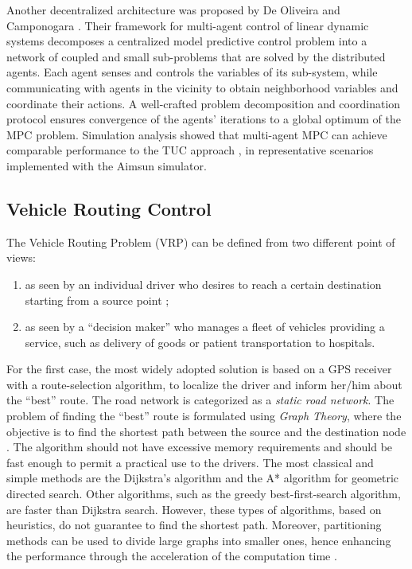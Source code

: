 \documentclass[10pt,onecolumn]{article}
\begin{document}
Another decentralized architecture was proposed by De Oliveira and Camponogara \cite{deOliveira2010}. Their framework for multi-agent control of linear dynamic systems decomposes a centralized model predictive control problem into a network of coupled and small sub-problems that are solved by the distributed agents. 
Each agent senses and controls the variables of its sub-system, while communicating with agents in the vicinity to obtain neighborhood variables and coordinate their actions. A well-crafted problem decomposition and coordination protocol ensures convergence of the agents' iterations to a global optimum of the MPC problem.
Simulation analysis showed that multi-agent MPC can achieve comparable performance to the TUC approach \cite{Diakaki2002}, in representative scenarios implemented with the Aimsun simulator. 


\subsection{Vehicle Routing Control}

The Vehicle Routing Problem (VRP) can be defined from two different point of views: 
\begin{enumerate}
 \item as seen by an individual driver who desires to reach a certain destination  starting from a source point ;
 \item as seen by a ``decision maker'' who manages a fleet of vehicles providing a service, such as delivery of goods or patient transportation to hospitals.
\end{enumerate}

For the first case, the most widely adopted solution is based on a GPS receiver with a route-selection algorithm, to localize the driver and inform her/him about the ``best'' route. 
The road network is categorized as a \textit{static road network}. The problem of finding the ``best'' route is formulated using \textit{Graph Theory}, where the objective is to find the shortest path between the source  and the destination node .
The algorithm should not have excessive memory requirements and should be fast enough to permit a practical use to the drivers. 
The most classical and simple methods are the Dijkstra's algorithm and the A* algorithm for geometric directed search. 
Other algorithms, such as the greedy best-first-search algorithm, are faster than Dijkstra search. However, these types of algorithms, based on heuristics, do not guarantee to find the shortest path.
Moreover, partitioning methods can be used to divide large graphs into smaller ones, hence enhancing the performance through the acceleration of the computation time \cite{Mohring2005}.
\end{document}
